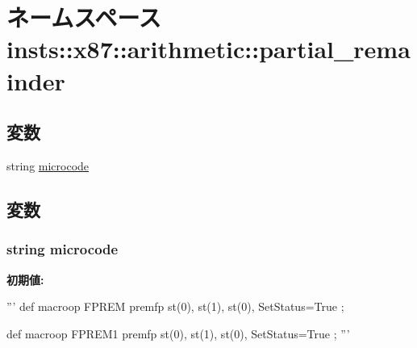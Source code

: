 \hypertarget{namespaceinsts_1_1x87_1_1arithmetic_1_1partial__remainder}{
\section{ネームスペース insts::x87::arithmetic::partial\_\-remainder}
\label{namespaceinsts_1_1x87_1_1arithmetic_1_1partial__remainder}
}
\subsection*{変数}
\begin{DoxyCompactItemize}
\item 
string \hyperlink{namespaceinsts_1_1x87_1_1arithmetic_1_1partial__remainder_a770f11a173e99389a8802f0107ed8f52}{microcode}
\end{DoxyCompactItemize}


\subsection{変数}
\hypertarget{namespaceinsts_1_1x87_1_1arithmetic_1_1partial__remainder_a770f11a173e99389a8802f0107ed8f52}{
\subsubsection[{microcode}]{\setlength{\rightskip}{0pt plus 5cm}string {\bf microcode}}}
\label{namespaceinsts_1_1x87_1_1arithmetic_1_1partial__remainder_a770f11a173e99389a8802f0107ed8f52}
{\bfseries 初期値:}
\begin{DoxyCode}
'''
def macroop FPREM {
    premfp st(0), st(1), st(0), SetStatus=True
};

def macroop FPREM1 {
    premfp st(0), st(1), st(0), SetStatus=True
};
'''
\end{DoxyCode}
